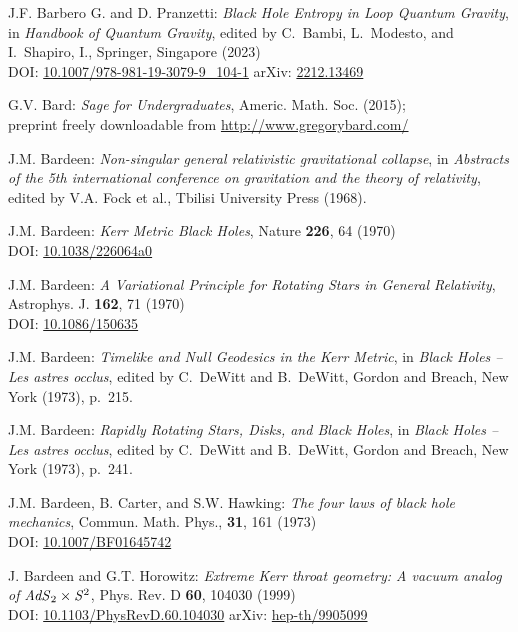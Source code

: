 \begin{thebibliography}{123}
J.F. Barbero G. and D. Pranzetti:
{\em Black Hole Entropy in Loop Quantum Gravity},
in {\em Handbook of Quantum Gravity}, edited by C.~Bambi, L.~Modesto, and I.~Shapiro, I.,
Springer, Singapore (2023)\\
DOI: \href{https://doi.org/10.1007/978-981-19-3079-9_104-1}{10.1007/978-981-19-3079-9\_104-1}\hfill
arXiv: \href{https://arxiv.org/abs/2212.13469}{2212.13469}

G.V. Bard: {\em Sage for Undergraduates}, Americ. Math. Soc. (2015); \\
preprint freely downloadable from \url{http://www.gregorybard.com/}

J.M. Bardeen:
{\em Non-singular general relativistic gravitational collapse},
in \emph{Abstracts of the 5th international conference on gravitation and the theory of relativity}, edited by V.A. Fock et al., Tbilisi University Press (1968).

J.M. Bardeen:
{\em Kerr Metric Black Holes},
Nature {\bf 226}, 64 (1970)\\
DOI: \href{https://doi.org/10.1038/226064a0}{10.1038/226064a0}

J.M. Bardeen:
{\em A Variational Principle for Rotating Stars in General Relativity},
Astrophys. J. {\bf  162}, 71 (1970)\\
DOI: \href{https://doi.org/10.1086/150635}{10.1086/150635}

J.M. Bardeen:
{\em Timelike and Null Geodesics in the Kerr Metric},
in {\em Black Holes -- Les astres occlus},  edited by C.~DeWitt and B.~DeWitt,
Gordon and Breach, New York (1973), p.~215.

J.M. Bardeen:
{\em Rapidly Rotating Stars, Disks, and Black Holes},
in {\em Black Holes -- Les astres occlus},  edited by C.~DeWitt and B.~DeWitt,
Gordon and Breach, New York (1973), p.~241.

J.M. Bardeen, B. Carter, and S.W. Hawking:
{\em The four laws of black hole mechanics},
Commun. Math. Phys., {\bf 31}, 161 (1973)\\
DOI: \href{https://doi.org/10.1007/BF01645742}{10.1007/BF01645742}

J. Bardeen and G.T. Horowitz:
{\em Extreme Kerr throat geometry: A vacuum analog of ${\it AdS}_2\times{\it S}^2$},
Phys. Rev. D {\bf 60}, 104030 (1999)\\
DOI: \href{https://doi.org/10.1103/PhysRevD.60.104030}{10.1103/PhysRevD.60.104030}\hfill
arXiv: \href{https://arxiv.org/abs/hep-th/9905099}{hep-th/9905099}


\end{thebibliography}
